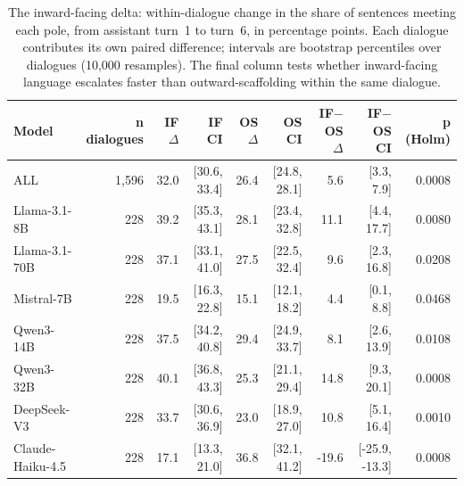 \begin{table}[t]
\centering
\small
\caption{The inward-facing delta: within-dialogue change in the share of sentences meeting each pole, from assistant turn~1 to turn~6, in percentage points. Each dialogue contributes its own paired difference; intervals are bootstrap percentiles over dialogues (10,000 resamples). The final column tests whether inward-facing language escalates faster than outward-scaffolding within the same dialogue.}
\label{tab:inward_delta}
\begin{tabular}{lrrrrrrrr}
\toprule
Model & n dialogues & IF $\Delta$ & IF CI & OS $\Delta$ & OS CI & IF$-$OS $\Delta$ & IF$-$OS CI & p (Holm) \\
\midrule
ALL & 1,596 & 32.0 & [30.6, 33.4] & 26.4 & [24.8, 28.1] & 5.6 & [3.3, 7.9] & 0.0008 \\
Llama-3.1-8B & 228 & 39.2 & [35.3, 43.1] & 28.1 & [23.4, 32.8] & 11.1 & [4.4, 17.7] & 0.0080 \\
Llama-3.1-70B & 228 & 37.1 & [33.1, 41.0] & 27.5 & [22.5, 32.4] & 9.6 & [2.3, 16.8] & 0.0208 \\
Mistral-7B & 228 & 19.5 & [16.3, 22.8] & 15.1 & [12.1, 18.2] & 4.4 & [0.1, 8.8] & 0.0468 \\
Qwen3-14B & 228 & 37.5 & [34.2, 40.8] & 29.4 & [24.9, 33.7] & 8.1 & [2.6, 13.9] & 0.0108 \\
Qwen3-32B & 228 & 40.1 & [36.8, 43.3] & 25.3 & [21.1, 29.4] & 14.8 & [9.3, 20.1] & 0.0008 \\
DeepSeek-V3 & 228 & 33.7 & [30.6, 36.9] & 23.0 & [18.9, 27.0] & 10.8 & [5.1, 16.4] & 0.0010 \\
Claude-Haiku-4.5 & 228 & 17.1 & [13.3, 21.0] & 36.8 & [32.1, 41.2] & -19.6 & [-25.9, -13.3] & 0.0008 \\
\bottomrule
\end{tabular}
\end{table}
